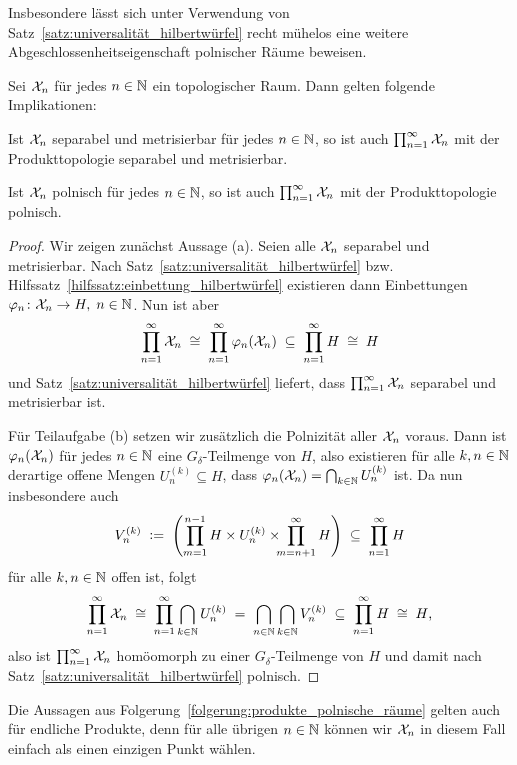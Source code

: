 \documentclass[../thesis/thesis.tex]{subfiles}
\begin{document}
	Insbesondere lässt sich unter Verwendung von Satz~\ref{satz:universalität_hilbertwürfel} recht mühelos eine weitere Abgeschlossenheitseigenschaft polnischer Räume beweisen.
	
	\begin{Folgerung}
		\label{folgerung:produkte_polnische_räume}
		Sei $\mathcal{X}_n$ für jedes $n \in \mathbb{N}$ ein topologischer Raum. Dann gelten folgende Implikationen:
		\begin{enumeratethm}
			\item Ist $\mathcal{X}_n$ separabel und metrisierbar für jedes $n \in \mathbb{N}$, so ist auch $\prod_{n=1}^{\infty} \mathcal{X}_n$ mit der Produkttopologie separabel und metrisierbar.
			\item Ist $\mathcal{X}_n$ polnisch für jedes $n \in \mathbb{N}$, so ist auch $\prod_{n=1}^{\infty} \mathcal{X}_n$ mit der Produkttopologie polnisch.
		\end{enumeratethm}
	\end{Folgerung}
	
	\begin{proof}
		Wir zeigen zunächst Aussage (a). Seien alle $\mathcal{X}_n$ separabel und metrisierbar. Nach Satz~\ref{satz:universalität_hilbertwürfel} bzw. 
		Hilfssatz~\ref{hilfssatz:einbettung_hilbertwürfel} existieren dann Einbettungen $\varphi_n \colon \mathcal{X}_n \to H, \; n \in \mathbb{N}$. Nun ist aber 
		\[ \prod_{n=1}^{\infty} \mathcal{X}_n \; \cong \; \prod_{n=1}^{\infty} \varphi_n(\mathcal{X}_n) \; \subseteq \; \prod_{n=1}^{\infty} H \; \cong \; H \]
		und Satz~\ref{satz:universalität_hilbertwürfel} liefert, dass $\prod_{n=1}^{\infty} \mathcal{X}_n$ separabel und metrisierbar ist.
		
		Für Teilaufgabe (b) setzen wir zusätzlich die Polnizität aller $\mathcal{X}_n$ voraus. Dann ist $\varphi_n(\mathcal{X}_n)$ für jedes $n \in \mathbb{N}$ eine $G_{\delta}$-Teilmenge von $H$, also
		existieren für alle $k, n \in \mathbb{N}$ derartige offene Mengen $U_n^{(k)} \subseteq H$, dass $\varphi_n(\mathcal{X}_n) = \bigcap_{k \in \mathbb{N}} U_n^{(k)}$ ist. Da nun insbesondere auch
		\[ V_n^{(k)} \; \vcentcolon = \; \left( \prod_{m=1}^{n-1} H \times U_n^{(k)} \times \!\!\! \prod_{m=n+1}^{\infty} H \right) \; \subseteq \; \prod_{n=1}^{\infty} H \]
		für alle $k, n \in \mathbb{N}$ offen ist, folgt
		\[ \prod_{n=1}^{\infty} \mathcal{X}_n \; \cong \; \prod_{n=1}^{\infty} \bigcap_{k \in \mathbb{N}} U_n^{(k)} \; = \; \bigcap_{n \in \mathbb{N}} \bigcap_{k \in \mathbb{N}} V_n^{(k)} \; \subseteq \; \prod_{n=1}^{\infty} H \; \cong \; H \text{,} \]
		also ist $\prod_{n=1}^{\infty} \mathcal{X}_n$ homöomorph zu einer $G_{\delta}$-Teilmenge von $H$ und damit nach Satz~\ref{satz:universalität_hilbertwürfel} polnisch.
	\end{proof}
	
	\begin{Bemerkung}
		Die Aussagen aus Folgerung~\ref{folgerung:produkte_polnische_räume} gelten auch für endliche Produkte, denn für alle übrigen $n \in \mathbb{N}$ können wir $\mathcal{X}_n$ in diesem Fall einfach als einen einzigen Punkt wählen.
	\end{Bemerkung}
	
\end{document}
